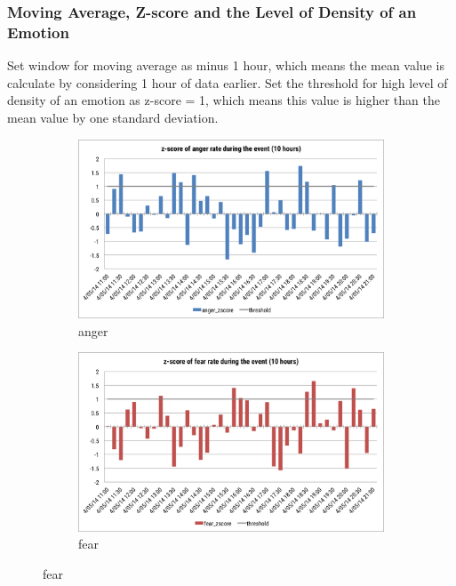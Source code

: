 \subsubsection{Moving Average, Z-score and the Level of Density of an Emotion}
Set window for moving average as minus 1 hour, which means the mean value is calculate by considering 1 hour of data earlier.
Set the threshold for high level of density of an emotion as z-score = 1, which means this value is higher than the mean value by one standard deviation.
\begin{figure}[htb!] 
\centering   
\begin{subfigure}{0.5\textwidth}
\centering    
\includegraphics[width=0.98\linewidth]{AngerZscoreEvent}
\caption{anger}
\label{fig:angerZscoreEvent}
\end{subfigure}%
\begin{subfigure}{0.5\textwidth}
\centering    
\includegraphics[width=0.98\linewidth]{FearZscoreEvent}
\caption{fear}
\label{fig:fearZscoreEvent}
\end{subfigure}


\end{figure}
